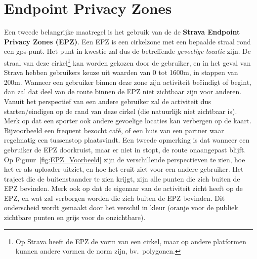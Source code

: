 \section{Endpoint Privacy Zones}\label{EPZ}
Een tweede belangrijke maatregel is het gebruik van de de \textbf{Strava
    Endpoint Privacy Zones (EPZ)}. Een EPZ is een cirkelzone met een bepaalde
straal rond een gps-punt. Het punt in kwestie zal dus de betreffende
\textit{gevoelige locatie} zijn. De straal van deze cirkel\footnote{Op Strava
    heeft de EPZ de vorm van een cirkel, maar op andere platformen kunnen andere
    vormen de norm zijn, bv.\ polygonen.} kan worden gekozen door de gebruiker, en
in het geval van Strava hebben gebruikers keuze uit waarden van 0 tot 1600m, in
stappen van 200m. Wanneer een gebruiker binnen deze zone zijn activiteit
beëindigt of begint, dan zal dat deel van de route binnen de EPZ niet zichtbaar
zijn voor anderen. Vanuit het perspectief van een andere gebruiker zal de
activiteit dus starten/eindigen op de rand van deze cirkel (die natuurlijk niet
zichtbaar is). Merk op dat een sporter ook andere gevoelige locaties kan
verbergen op de kaart. Bijvoorbeeld een frequent bezocht café, of een huis van
een partner waar regelmatig een tussenstop plaatsvindt. Een tweede opmerking is
dat wanneer een gebruiker de EPZ doorkruist, maar er niet in stopt, de route
onaangepast blijft. Op Figuur~\ref{fig:EPZ_Voorbeeld} zijn de verschillende
perspectieven te zien, hoe het er als uploader uitziet, en hoe het eruit ziet
voor een andere gebruiker. Het traject die de buitenstaander te zien krijgt,
zijn alle punten die zich buiten de EPZ bevinden. Merk ook op dat de eigenaar
van de activiteit zicht heeft op de EPZ, en wat zal verborgen worden die zich
buiten de EPZ bevinden. Dit onderscheid wordt gemaakt door het verschil in
kleur (oranje voor de publiek zichtbare punten en grijs voor de onzichtbare).
